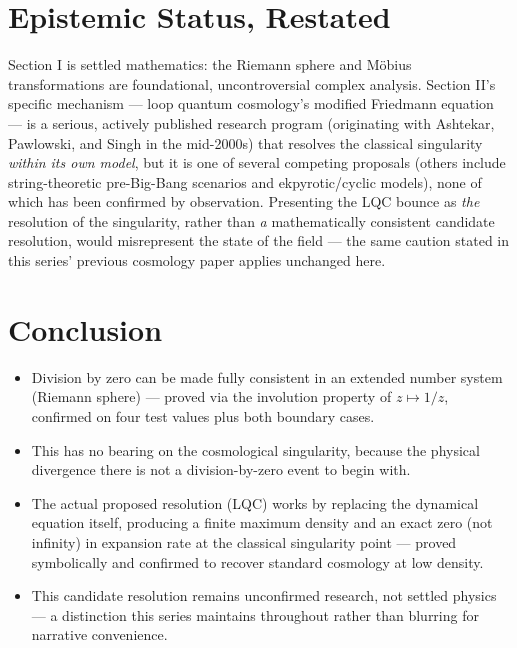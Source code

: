 \documentclass[10pt,journal,compsoc]{IEEEtran}
\begin{document}
\section{Epistemic Status, Restated}
Section I is settled mathematics: the Riemann sphere and Möbius transformations are foundational, uncontroversial complex analysis. Section II's specific mechanism — loop quantum cosmology's modified Friedmann equation — is a serious, actively published research program (originating with Ashtekar, Pawlowski, and Singh in the mid-2000s) that resolves the classical singularity \emph{within its own model}, but it is one of several competing proposals (others include string-theoretic pre-Big-Bang scenarios and ekpyrotic/cyclic models), none of which has been confirmed by observation. Presenting the LQC bounce as \emph{the} resolution of the singularity, rather than \emph{a} mathematically consistent candidate resolution, would misrepresent the state of the field — the same caution stated in this series' previous cosmology paper applies unchanged here.

\section{Conclusion}
\begin{itemize}
    \item Division by zero can be made fully consistent in an extended number system (Riemann sphere) — proved via the involution property of $z\mapsto1/z$, confirmed on four test values plus both boundary cases.
    \item This has no bearing on the cosmological singularity, because the physical divergence there is not a division-by-zero event to begin with.
    \item The actual proposed resolution (LQC) works by replacing the dynamical equation itself, producing a finite maximum density and an exact zero (not infinity) in expansion rate at the classical singularity point — proved symbolically and confirmed to recover standard cosmology at low density.
    \item This candidate resolution remains unconfirmed research, not settled physics — a distinction this series maintains throughout rather than blurring for narrative convenience.
\end{itemize}
\end{document}
